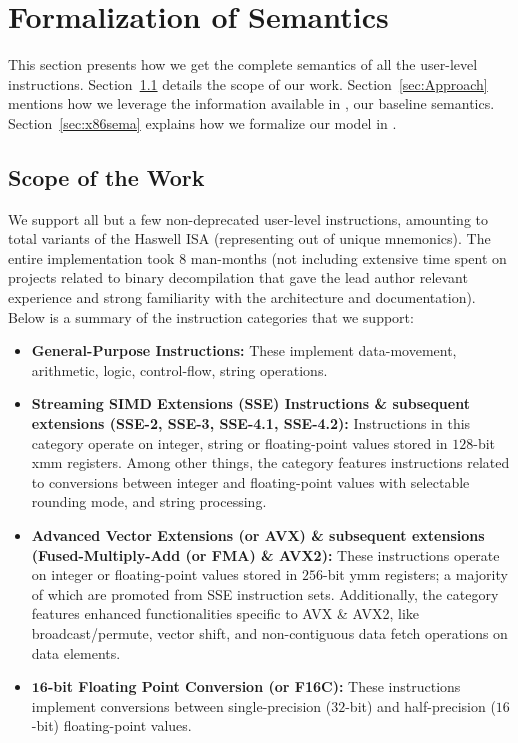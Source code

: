 \section{Formalization of \ISA Semantics}
\label{sec:harvestsema}
This section presents how we get the complete semantics of all the
user-level instructions. Section~\ref{sec:IC} details the scope of our work. Section~\ref{sec:Approach} mentions how we leverage the information available in \Strata, our baseline semantics. Section~\ref{sec:x86sema} explains how we formalize our model in \K.

\subsection{Scope of the Work}\label{sec:IC}
We support all but a few non-deprecated user-level instructions, amounting to \currentIS{} total variants of the Haswell \ISA ISA (representing \currentIntel{} out of \totalIntel{} 
unique mnemonics). The entire implementation took 8 man-months (not including extensive time spent on projects related to binary decompilation that gave the lead author relevant experience and strong familiarity with the \ISA architecture and documentation).  Below is a summary of the instruction categories that we support:
\begin{itemize}
    \item \textbf{General-Purpose Instructions:} These implement data-movement, arithmetic, logic, control-flow, string operations.
    
    \item \textbf{Streaming SIMD Extensions (SSE) Instructions \&   subsequent extensions (SSE-2, SSE-3, SSE-4.1, SSE-4.2):} Instructions in this category operate on integer, string or floating-point values stored in $128$-bit xmm registers. Among other things, the category features instructions related to conversions between integer and floating-point values with selectable rounding mode, and string processing.
    
    \item \textbf{Advanced Vector Extensions (or AVX) \& subsequent extensions (Fused-Multiply-Add (or FMA) \& AVX2):} These instructions operate on integer or floating-point values stored in $256$-bit ymm registers; a majority of which are promoted from SSE instruction sets. Additionally, the category features enhanced functionalities specific to AVX \& AVX2, like  broadcast/permute, vector shift, and non-contiguous data fetch operations on data elements. 
    \item \textbf{$\textbf{16}$-bit Floating Point Conversion (or F16C):} These instructions implement conversions between single-precision ($32$-bit) and half-precision ($16$-bit) floating-point values. 
\end{itemize}

